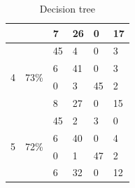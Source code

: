 \documentclass[USenglish]{ifimaster}  %
\begin{document}
\begin{table}[h]
\begin{tabular}{@{}llllll@{}}
		\multicolumn{1}{l|}{} & \multicolumn{1}{l|}{} & \multicolumn{1}{l|}{7} & \multicolumn{1}{l|}{26} & \multicolumn{1}{l|}{0} & 17 \\ \midrule
		\multicolumn{1}{l|}{\multirow{4}{*}{4}} & \multicolumn{1}{l|}{\multirow{4}{*}{73\%}} & \multicolumn{1}{l|}{45} & \multicolumn{1}{l|}{4} & \multicolumn{1}{l|}{0} & 3 \\ \cmidrule(l){3-6} 
		\multicolumn{1}{l|}{} & \multicolumn{1}{l|}{} & \multicolumn{1}{l|}{6} & \multicolumn{1}{l|}{41} & \multicolumn{1}{l|}{0} & 3 \\ \cmidrule(l){3-6} 
		\multicolumn{1}{l|}{} & \multicolumn{1}{l|}{} & \multicolumn{1}{l|}{0} & \multicolumn{1}{l|}{3} & \multicolumn{1}{l|}{45} & 2 \\ \cmidrule(l){3-6} 
		\multicolumn{1}{l|}{} & \multicolumn{1}{l|}{} & \multicolumn{1}{l|}{8} & \multicolumn{1}{l|}{27} & \multicolumn{1}{l|}{0} & 15 \\ \midrule
		\multicolumn{1}{l|}{\multirow{4}{*}{5}} & \multicolumn{1}{l|}{\multirow{4}{*}{72\%}} & \multicolumn{1}{l|}{45} & \multicolumn{1}{l|}{2} & \multicolumn{1}{l|}{3} & 0 \\ \cmidrule(l){3-6} 
		\multicolumn{1}{l|}{} & \multicolumn{1}{l|}{} & \multicolumn{1}{l|}{6} & \multicolumn{1}{l|}{40} & \multicolumn{1}{l|}{0} & 4 \\ \cmidrule(l){3-6} 
		\multicolumn{1}{l|}{} & \multicolumn{1}{l|}{} & \multicolumn{1}{l|}{0} & \multicolumn{1}{l|}{1} & \multicolumn{1}{l|}{47} & 2 \\ \cmidrule(l){3-6} 
		\multicolumn{1}{l|}{} & \multicolumn{1}{l|}{} & \multicolumn{1}{l|}{6} & \multicolumn{1}{l|}{32} & \multicolumn{1}{l|}{0} & 12 \\ \bottomrule
	\end{tabular}
	\caption{Decision tree}
	\label{dt4}
\end{table}
\FloatBarrier
\end{document}
